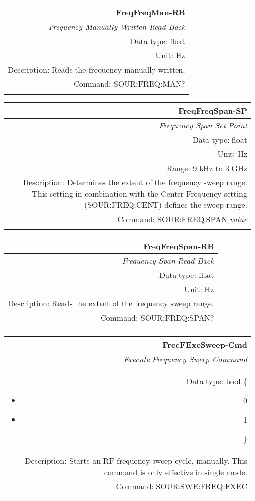 \documentclass[openany]{article}
\begin{document}
		\begin{tabular}{N}
			\hline
			\bfseries FreqFreqMan-RB \\ \hline
			\emph{Frequency Manually Written Read Back} \\
			Data type: float \\
			Unit: Hz \\
			Description: Reads the frequency manually written. \\
			Command: SOUR:FREQ:MAN? \\
			\\

		\end{tabular}


		\begin{tabular}{N}
			\hline
			\bfseries FreqFreqSpan-SP \\ \hline
			\emph{Frequency Span Set Point} \\
			Data type: float \\
			Unit: Hz \\
			Range: 9 kHz to 3 GHz \\
			Description: Determines the extent of the frequency sweep range. This setting in combination with the Center Frequency setting (SOUR:FREQ:CENT) defines the sweep range. \\
			Command: SOUR:FREQ:SPAN \emph{value} \\
			\\
			
		\end{tabular}


		\begin{tabular}{N}
			\hline
			\bfseries FreqFreqSpan-RB \\ \hline
			\emph{Frequency Span Read Back} \\
			Data type: float \\
			Unit: Hz \\
			Description: Reads the extent of the frequency sweep range. \\
			Command: SOUR:FREQ:SPAN? \\
			\\

		\end{tabular}


		\begin{tabular}{N}
			\hline
			\bfseries FreqFExeSweep-Cmd \\ \hline
			\emph{Execute Frequency Sweep Command} \\
			Data type: bool \{\begin{itemize}[noitemsep]
				\small
				\item[] 0
				\item[] 1
			\end{itemize}\} \\
			Description: Starts an RF frequency sweep cycle, manually. This command is only effective in single mode. \\
			Command: SOUR:SWE:FREQ:EXEC \\
			\\

		\end{tabular}
\end{document}
